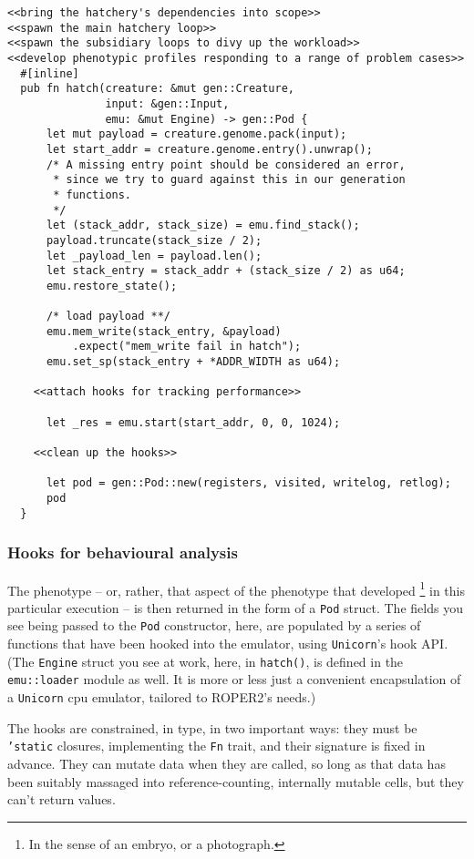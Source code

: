 \documentclass[11pt]{article}
\begin{document}
\lstset{language=rust,label=orgb3dbb18,caption= ,captionpos=b,numbers=none}
\begin{lstlisting}
<<bring the hatchery's dependencies into scope>>
<<spawn the main hatchery loop>>
<<spawn the subsidiary loops to divy up the workload>>
<<develop phenotypic profiles responding to a range of problem cases>>
  #[inline]
  pub fn hatch(creature: &mut gen::Creature, 
               input: &gen::Input, 
               emu: &mut Engine) -> gen::Pod {
      let mut payload = creature.genome.pack(input);
      let start_addr = creature.genome.entry().unwrap();
      /* A missing entry point should be considered an error,
       * since we try to guard against this in our generation
       * functions.
       */
      let (stack_addr, stack_size) = emu.find_stack();
      payload.truncate(stack_size / 2);
      let _payload_len = payload.len();
      let stack_entry = stack_addr + (stack_size / 2) as u64;
      emu.restore_state();

      /* load payload **/
      emu.mem_write(stack_entry, &payload)
          .expect("mem_write fail in hatch");
      emu.set_sp(stack_entry + *ADDR_WIDTH as u64);

    <<attach hooks for tracking performance>>

      let _res = emu.start(start_addr, 0, 0, 1024);

    <<clean up the hooks>>

      let pod = gen::Pod::new(registers, visited, writelog, retlog);
      pod
  }
\end{lstlisting}


\subsubsection{Hooks for behavioural analysis}
\label{sec:orgf5243e1}
The phenotype -- or, rather, that aspect of the phenotype that developed
\footnote{In the sense of an embryo, or a photograph.} in this particular execution
-- is then returned in the form of a \texttt{Pod} struct. The fields you see being
passed to the \texttt{Pod} constructor, here, are populated by a series of functions
that have been hooked into the emulator, using \texttt{Unicorn}'s hook API. (The
\texttt{Engine} struct you see at work, here, in \texttt{hatch()}, is defined in the
\texttt{emu::loader} module as well. It is more or less just a convenient 
encapsulation of a \texttt{Unicorn} \gls{cpu} emulator, tailored to ROPER2's needs.)

The hooks are constrained, in type, in two important ways: they must be
\texttt{'static} closures, implementing the \texttt{Fn} trait, and their signature is
fixed in advance. They can mutate data when they are called, so long as
that data has been suitably massaged into reference-counting, internally
mutable cells, but they can't return values. 
\end{document}
